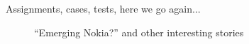 \begin{post}
	\begin{content}
Assignments, cases, tests, here we go again...
\begin{figure}[h]
\begin{center}
\vspace{-6pt}
\caption*{``Emerging Nokia?'' and other interesting stories}
\end{center}
\end{figure}

\end{content}
\end{post}
